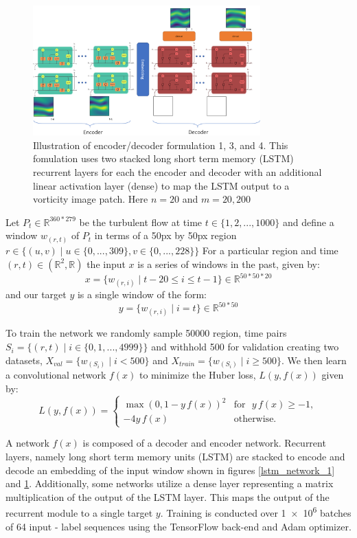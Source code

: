 \documentclass[12pt]{article}
\theoremstyle{plain}
\theoremstyle{remark}
\theoremstyle{definition}
\begin{document}
\begin{figure}
	\begin{center}
		\includegraphics[width=0.78\textwidth]{images/lstm_2_setup.PNG}
		\caption{\small Illustration of encoder/decoder formulation 1, 3, and 4. This fomulation uses two stacked long short term memory (LSTM) recurrent layers for each the encoder and decoder with an additional linear activation layer (dense) to map the LSTM output to a vorticity image patch. Here $n=20$ and $m=20,200$}
		\label{lstm_network_2}
	\end{center}	
\end{figure}

Let $P_t \in \mathbb{R}^{360*279} $ be the turbulent flow at time $t \in \{1, 2, ..., 1000\}$ and define a window $w_{(r, t)}$ of $P_t$ in terms of a 50px by 50px region $r \in \{(u,v) \mid u \in \{0, ..., 309\}, v \in \{0, ...,  228\}\}$ 
For a particular region and time $(r,t) \in (\mathbb{R}^2,\mathbb{R})$ the input $x$ is a series of windows in the past, given by:
$$x = \{w_{(r,i)} \mid t-20 \leq i \leq t-1 \} \in \mathbb{R}^{50*50*20}$$ and our target $y$ is a single window of the form: $$y = \{w_{(r,i)} \mid i = t  \} \in \mathbb{R}^{50*50}$$


To train the network we randomly sample 50000 region, time pairs $S_i = \{(r, t) \mid i \in \{0, 1, ..., 4999\} \}$ and withhold 500 for validation creating two datasets, $X_{val} = \{w_{(S_i)} \mid i < 500 \} $ and $X_{train} = \{ {w_{(S_i)}\mid i \geq 500} \}$. We then learn a convolutional network $f(x)$ to minimize the Huber loss, $L(y, f(x))$ given by:
$$L(y, f(x)) = \begin{cases}
\max(0, 1 - y \, f(x))^2 & \textrm{for }\, \,  y \, f(x) \ge -1, \\
-4y \, f(x)              & \textrm{otherwise.}
\end{cases}$$

A network $f(x)$ is composed of a decoder and encoder network. Recurrent layers, namely long short term memory units (LSTM) are stacked to encode and decode an embedding of the input window shown in figures \ref{lstm_network_1} and  \ref{lstm_network_2}. Additionally, some networks utilize a dense layer representing a matrix multiplication of the output of the LSTM layer. This maps the output of the recurrent module to a single target $y$. Training is conducted over \num{1e+6} batches of 64 input - label sequences using the TensorFlow back-end and Adam optimizer.
\end{document}
